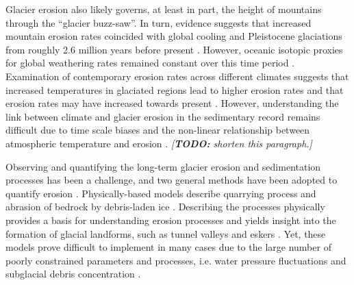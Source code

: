 \documentclass[esurf, manuscript]{copernicus}
\newcommand{\todo}[1]{\textcolor{Rd}{\emph{[\textbf{TODO:} #1]}}}
\begin{document}
    Glacier erosion also likely governs, at least in part,
    the height of mountains \citep{Egholm.etal.2009,Thomson.etal.2010} through
    the ``glacier buzz-saw''. In turn, evidence suggests that increased
    mountain erosion rates coincided with global cooling and Pleistocene
    glaciations from roughly 2.6 million years before present
    \citep{Herman.Champagnac.2016}. However, oceanic isotopic proxies for
    global weathering rates remained constant over this time period
    \citep{Willenbring.Von-Blanckenburg.2010}. Examination of contemporary
    erosion rates across different climates suggests that increased temperatures
    in glaciated regions lead to higher erosion rates and that erosion rates
    may have increased towards present \citep{Koppes.Montgomery.2009,
    Koppes.etal.2015, Fernandez.etal.2016}. However, understanding the link
    between climate and glacier erosion in the sedimentary record remains
    difficult due to time scale biases \citep{Ganti.etal.2016} and the
    non-linear relationship  between atmospheric temperature and erosion
    \citep[e.g.,][]{Anderson.etal.2012,Mariotti.etal.2021}.
    \todo{shorten this paragraph.}

    Observing and quantifying the long-term glacier erosion and sedimentation
    processes has been a challenge, and two general methods have been adopted
    to quantify erosion \citep{Alley.etal.2019}. Physically-based models
    describe quarrying process and abrasion of bedrock by debris-laden ice
    \citep[e.g.,][]{Alley.etal.1997, Iverson.2012, Beaud.etal.2014}. Describing
    the processes physically provides a basis for understanding erosion
    processes \citep{Hallet.1979, Ugelvig.etal.2018} and yields insight into
    the formation of glacial landforms, such as tunnel valleys and eskers
    \citep{Beaud.etal.2018, Hewitt.Creyts.2019}. Yet, these models prove
    difficult to implement in many cases due to the large number of poorly
    constrained parameters and processes, i.e. water pressure fluctuations and
    subglacial debris concentration \citep[e.g.,][]{Hallet.1979, Seguinot.2008,
    Ugelvig.etal.2018}.
\end{document}
